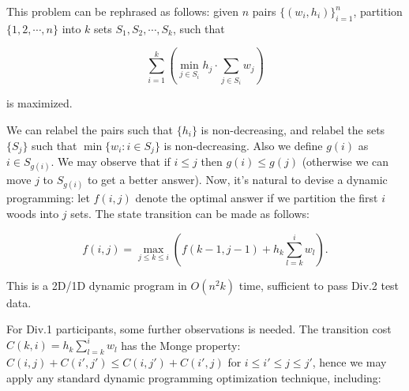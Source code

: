\documentclass[a4paper,10.5pt,twoside]{article}
\begin{document}
This problem can be rephrased as follows: given $n$ pairs $\{(w_i, h_i)\}_{i=1}^n$, partition $\{1, 2, \cdots, n\}$ into $k$ sets $S_1, S_2, \cdots, S_k$, such that 

$$ \sum_{i=1}^k \left(\min_{j \in S_i} h_j \cdot \sum_{j \in S_i} w_j \right) $$

is maximized.

We can relabel the pairs such that $\{h_i\}$ is non-decreasing, and relabel the sets $\{S_j\}$ such that $\min\{w_i : i \in S_j\}$ is non-decreasing. Also we define $g(i)$ as $i \in S_{g(i)}$. We may observe that if $i \leq j$ then $g(i) \leq g(j)$ (otherwise we can move $j$ to $S_{g(i)}$ to get a better answer). Now, it's natural to devise a dynamic programming: let $f(i,j)$ denote the optimal answer if we partition the first $i$ woods into $j$ sets. The state transition can be made as follows:

$$ f(i,j) = \max_{j \leq k \leq i} \left( f(k-1, j-1) + h_{k} \sum_{l = k}^i w_l \right). $$

This is a 2D/1D dynamic program in $O(n^2 k)$ time, sufficient to pass Div.2 test data.

For Div.1 participants, some further observations is needed. The transition cost $C(k, i) = h_{k} \sum_{l = k}^i w_l$ has the Monge property: $C(i, j) + C(i', j') \leq C(i, j') + C(i', j)$ for $i \leq i' \leq j \leq j'$, hence we may apply any standard dynamic programming optimization technique, including:
\end{document}
